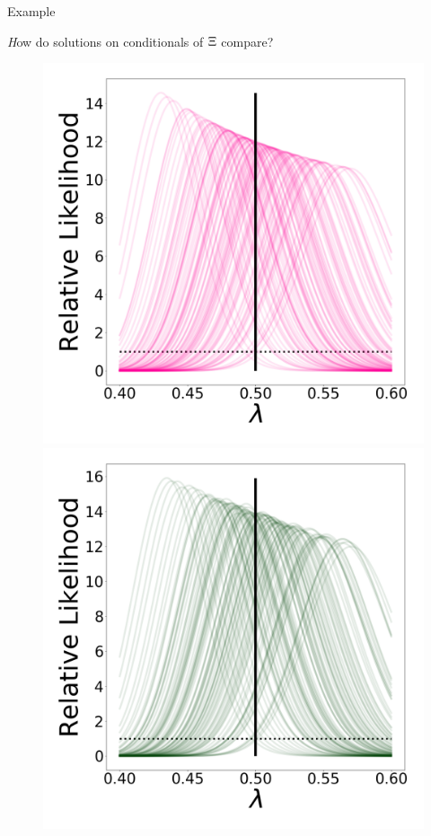 \begin{block}{Example}

{\emph How do solutions on conditionals of $\operatorname*{\Xi}$ compare?}
    \begin{figure}
        \includegraphics[width=13cm]{figures/updated_stability_D10_sigma-10E-4}
        \includegraphics[width=13cm]{figures/posterior_stability_D10_sigma-10E-4}\\

\end{figure}
\end{block}
